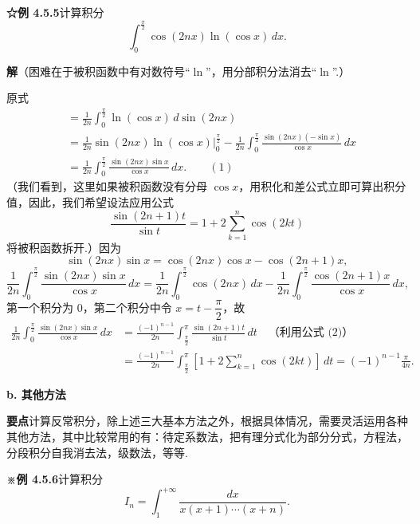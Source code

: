 \documentclass[UTF8,12pt,a4paper,fontset=fandol]{ctexart}
\begin{document}
\noindent\textbf{☆例 4.5.5}\quad 计算积分
\[
\int_0^{\frac\pi2}\cos(2nx)\ln(\cos x)\,dx.
\]

\noindent\textbf{解}\quad （困难在于被积函数中有对数符号“$\ln$”，用分部积分法消去“$\ln$”.）

原式
\[
\begin{aligned}
&=\frac1{2n}\int_0^{\frac\pi2}\ln(\cos x)\,d\sin(2nx)\\
&=\frac1{2n}\sin(2nx)\ln(\cos x)\Big|_0^{\frac\pi2}
-\frac1{2n}\int_0^{\frac\pi2}\frac{\sin(2nx)(-\sin x)}{\cos x}\,dx\\
&=\frac1{2n}\int_0^{\frac\pi2}
\frac{\sin(2nx)\sin x}{\cos x}\,dx. \qquad(1)
\end{aligned}
\]
（我们看到，这里如果被积函数没有分母 $\cos x$，用积化和差公式立即可算出积分值，因此，我们希望设法应用公式
\[
\frac{\sin(2n+1)t}{\sin t}=1+2\sum_{k=1}^n\cos(2kt) \tag{2}
\]
将被积函数拆开.）因为
\[
\sin(2nx)\sin x=\cos(2nx)\cos x-\cos(2n+1)x,
\]
\[
\frac1{2n}\int_0^{\frac\pi2}\frac{\sin(2nx)\sin x}{\cos x}\,dx
=\frac1{2n}\int_0^{\frac\pi2}\cos(2nx)\,dx
-\frac1{2n}\int_0^{\frac\pi2}\frac{\cos(2n+1)x}{\cos x}\,dx,
\]
第一个积分为 0，第二个积分中令 $x=t-\dfrac\pi2$，故
\[
\begin{aligned}
\frac1{2n}\int_0^{\frac\pi2}\frac{\sin(2nx)\sin x}{\cos x}\,dx
&=\frac{(-1)^{n-1}}{2n}
\int_{\frac\pi2}^{\pi}\frac{\sin(2n+1)t}{\sin t}\,dt\quad\text{（利用公式 (2)）}\\
&=\frac{(-1)^{n-1}}{2n}
\int_{\frac\pi2}^{\pi}\left[1+2\sum_{k=1}^n\cos(2kt)\right]\,dt
=(-1)^{n-1}\frac{\pi}{4n}.
\end{aligned}
\]

\noindent\textbf{b. 其他方法}

\noindent\textbf{要点}\quad 计算反常积分，除上述三大基本方法之外，根据具体情况，需要灵活运用各种其他方法，其中比较常用的有：待定系数法，把有理分式化为部分分式，方程法，分段积分自我消去法，级数法，等等.

\noindent\textbf{※例 4.5.6}\quad 计算积分
\[
I_n=\int_1^{+\infty}\frac{dx}{x(x+1)\cdots(x+n)}.
\]
\end{document}
